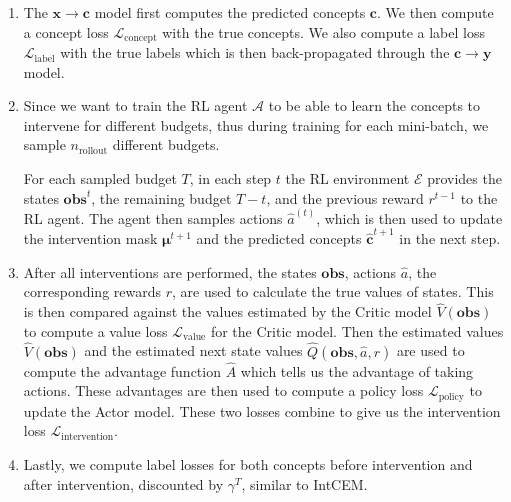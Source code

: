\begin{enumerate}
    \item The $\mathbf{x} \to \mathbf{c}$ model first computes the predicted concepts $\mathbf{c}$.
    We then compute a concept loss $\mathcal{L}_{\text{concept}}$ with the true concepts.
    We also compute a label loss $\mathcal{L}_{\text{label}}$ with the true labels
    which is then 
    back-propagated through the $\mathbf{c} \to \mathbf{y}$ model.
    \item Since we want to train the RL agent $\mathcal{A}$ to be able to learn 
    the concepts to intervene for different budgets, thus during training 
    for each mini-batch, we sample $n_{\text{rollout}}$ different budgets.

    For each sampled budget $T$, 
    in each step $t$
    the RL environment $\mathcal{E}$ provides
    the states $\textbf{obs}^t$, the remaining budget $T - t$, 
    and the previous reward $r^{t-1}$ to the RL agent. The agent then samples actions
    $\hat{a}^{(t)}$, which is then used to update the intervention mask $\bm{\mu}^{t+1}$
    and the predicted concepts $\hat{\mathbf{c}}^{t+1}$ in the next step.

    \item After all interventions are performed, the states $\textbf{obs}$,
    actions $\hat{a}$,
    the corresponding rewards $r$, are used to calculate the true values of states.
    This is then compared against the values estimated by the Critic model
    $\hat{V}(\textbf{obs})$
    to compute a value loss $\mathcal{L}_{\text{value}}$ for the Critic model.
    Then the estimated values $\hat{V}(\textbf{obs})$ and the estimated 
    next state values $\hat{Q}(\textbf{obs}, \hat{a}, r)$
    are used to compute the advantage function $\hat{A}$ which tells us
    the advantage of taking actions. These advantages are then used to compute
    a policy loss $\mathcal{L}_{\text{policy}}$ to update the Actor model.
    These two losses combine to give us the intervention loss $\mathcal{L}_{\text{intervention}}$.
    \item Lastly, we compute label losses for both concepts before intervention and after intervention,
    discounted by $\gamma^T$, similar to IntCEM.
\end{enumerate}

